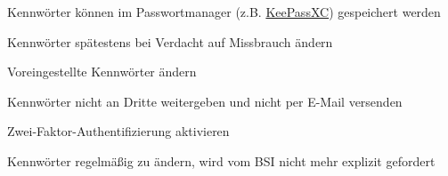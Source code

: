 \item Kennwörter können im Passwortmanager (z.B. \href{https://keepassxc.org/}{KeePassXC}) gespeichert werden
\item Kennwörter spätestens bei Verdacht auf Missbrauch ändern
\item Voreingestellte Kennwörter ändern
\item Kennwörter nicht an Dritte weitergeben und nicht per E-Mail versenden
\item Zwei-Faktor-Authentifizierung aktivieren
\item Kennwörter regelmäßig zu ändern, wird vom BSI nicht mehr explizit gefordert